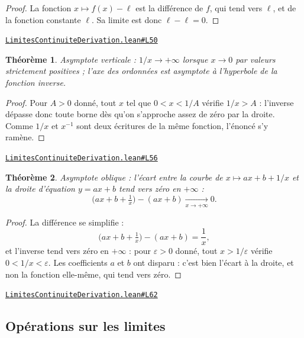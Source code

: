 \documentclass[11pt,a4paper]{article}
\theoremstyle{definition}
\theoremstyle{plain}
\newtheorem{theoreme}{Théorème}
\newcommand{\source}[2]{\par\smallskip\noindent\hfill{\footnotesize\href{#1}{\texttt{#2}}}\par\smallskip}
\begin{document}
\begin{proof}
La fonction $x \mapsto f(x) - \ell$ est la différence de $f$, qui tend vers $\ell$, et de
la fonction constante $\ell$. Sa limite est donc $\ell - \ell = 0$.
\end{proof}
\source{https://github.com/Commutator-IO/learn-lean/blob/main/courses/02-lycee/04-limites-continuite-derivation/LimitesContinuiteDerivation.lean\#L50}{LimitesContinuiteDerivation.lean\#L50}

\begin{theoreme}
Asymptote verticale : $1/x \to +\infty$ lorsque $x \to 0$ par valeurs strictement
positives ; l'axe des ordonnées est asymptote à l'hyperbole de la fonction inverse.
\end{theoreme}

\begin{proof}
Pour $A > 0$ donné, tout $x$ tel que $0 < x < 1/A$ vérifie $1/x > A$ : l'inverse dépasse
donc toute borne dès qu'on s'approche assez de zéro par la droite. Comme $1/x$ et $x^{-1}$ sont deux écritures de la même
fonction, l'énoncé s'y ramène.
\end{proof}
\source{https://github.com/Commutator-IO/learn-lean/blob/main/courses/02-lycee/04-limites-continuite-derivation/LimitesContinuiteDerivation.lean\#L56}{LimitesContinuiteDerivation.lean\#L56}

\begin{theoreme}
Asymptote oblique : l'écart entre la courbe de $x \mapsto ax + b + 1/x$ et la droite
d'équation $y = ax + b$ tend vers zéro en $+\infty$ :
\[ \bigl(ax + b + \tfrac{1}{x}\bigr) - (ax + b) \xrightarrow[x \to +\infty]{} 0 . \]
\end{theoreme}

\begin{proof}
La différence se simplifie :
\[ \bigl(ax + b + \tfrac{1}{x}\bigr) - (ax + b) = \frac{1}{x} , \]
et l'inverse tend vers zéro en $+\infty$ : pour $\varepsilon > 0$ donné, tout $x > 1/\varepsilon$
vérifie $0 < 1/x < \varepsilon$. Les coefficients $a$ et $b$ ont disparu : c'est bien
l'écart à la droite, et non la fonction elle-même, qui tend vers zéro.
\end{proof}
\source{https://github.com/Commutator-IO/learn-lean/blob/main/courses/02-lycee/04-limites-continuite-derivation/LimitesContinuiteDerivation.lean\#L62}{LimitesContinuiteDerivation.lean\#L62}

\subsection{Opérations sur les limites}
\end{document}
